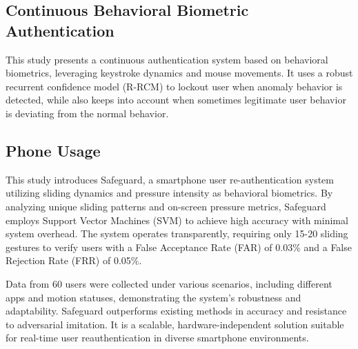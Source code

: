 \subsection{Continuous Behavioral Biometric Authentication}
\label{subsec:continuous-behavioral-biometric-authentication}

\parencite{4_Continuous_Authentication}
This study presents a continuous authentication system based on behavioral biometrics, leveraging keystroke dynamics and mouse movements. 
It uses a robust recurrent confidence model (R-RCM) to lockout user when anomaly behavior is detected, while also keeps into account when sometimes legitimate user behavior is deviating from the normal behavior.


\subsection{Phone Usage}

\parencite{17_Phone} This study introduces Safeguard, a smartphone user re-authentication system utilizing sliding dynamics and pressure intensity as behavioral biometrics. By analyzing unique sliding patterns and on-screen pressure metrics, Safeguard employs Support Vector Machines (SVM) to achieve high accuracy with minimal system overhead. The system operates transparently, requiring only 15-20 sliding gestures to verify users with a False Acceptance Rate (FAR) of 0.03\% and a False Rejection Rate (FRR) of 0.05\%.

Data from 60 users were collected under various scenarios, including different apps and motion statuses, demonstrating the system's robustness and adaptability. Safeguard outperforms existing methods in accuracy and resistance to adversarial imitation. It is a scalable, hardware-independent solution suitable for real-time user reauthentication in diverse smartphone environments.

